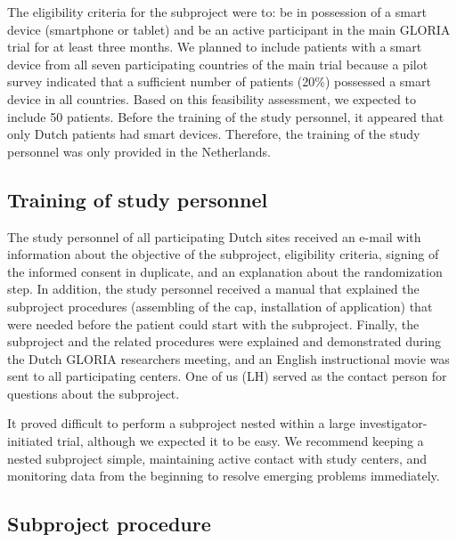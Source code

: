 \documentclass[twocolumn, issue, empirical, authordate]{jote-new-article}
\begin{document}
 The eligibility criteria for the subproject were to: be in possession of a smart device (smartphone or tablet) and be an active participant in the main GLORIA trial for at least three months. We planned to include patients with a smart device from all seven participating countries of the main trial because a pilot survey indicated that a sufficient number of patients (20\%) possessed a smart device in all countries. Based on this feasibility assessment, we expected to include 50 patients.
 Before the training of the study personnel, it appeared that only Dutch patients had smart devices. Therefore, the training of the study personnel was only provided in the Netherlands.


\subsection{Training of study personnel}

 The study personnel of all participating Dutch sites received an e-mail with information about the objective of the subproject, eligibility criteria, signing of the informed consent in duplicate, and an explanation about the randomization step. In addition, the study personnel received a manual that explained the subproject procedures (assembling of the cap, installation of application) that were needed before the patient could start with the subproject. Finally, the subproject and the related procedures were explained and demonstrated during the Dutch GLORIA researchers meeting, and an English instructional movie was sent to all participating centers. One of us (LH) served as the contact person for questions about the subproject.




\begin{takeHomeMessage}
 It proved difficult to perform a subproject nested within a large investigator-initiated trial, although we expected it to be easy. We recommend keeping a nested subproject simple, maintaining active contact with study centers, and monitoring data from the beginning to resolve emerging problems immediately.
\end{takeHomeMessage}

\subsection{Subproject procedure}
\end{document}
